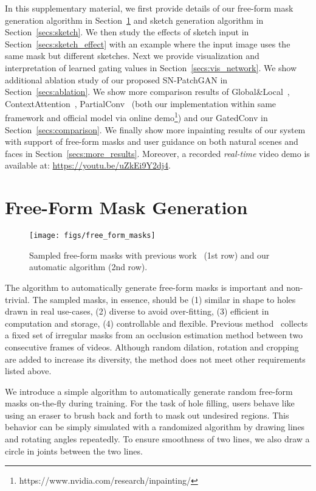 \documentclass[10pt,twocolumn,letterpaper]{article}
\begin{document}
{\small


}

\newpage
\appendix


In this supplementary material, we first provide details of our free-form mask generation algorithm in Section~\ref{secs:mask} and sketch generation algorithm in Section~\ref{secs:sketch}.
We then study the effects of sketch input in Section~\ref{secs:sketch_effect} with an example where the input image uses the same mask but different sketches.
Next we provide visualization and interpretation of learned gating values in Section~\ref{secs:vis_network}.
We show additional ablation study of our proposed SN-PatchGAN in Section~\ref{secs:ablation}.
We show more comparison results of Global\&Local~\cite{iizuka2017globally}, ContextAttention~\cite{yu2018generative}, PartialConv~\cite{liu2018image} (both our implementation within same framework and official model via online demo\footnote{https://www.nvidia.com/research/inpainting/}) and our GatedConv in Section~\ref{secs:comparison}. We finally show more inpainting results of our system with support of free-form masks and user guidance on both natural scenes and faces in Section~\ref{secs:more_results}. Moreover, a recorded \textit{real-time} video demo is available at: \url{https://youtu.be/uZkEi9Y2dj4}.

\section{Free-Form Mask Generation} \label{secs:mask}
\begin{figure}[h]
  \centering
  \texttt{[image: figs/free\_form\_masks]}
  \caption{Sampled free-form masks with previous work~\cite{liu2018image} (1st row) and our automatic algorithm (2nd row). }
  \label{figs:masks}
\end{figure}

The algorithm to automatically generate free-form masks is important and non-trivial. The sampled masks, in essence, should be (1) similar in shape to holes drawn in real use-cases, (2) diverse to avoid over-fitting, (3) efficient in computation and storage, (4) controllable and flexible. Previous method~\cite{liu2018image} collects a fixed set of irregular masks from an occlusion estimation method between two consecutive frames of videos. Although random dilation, rotation and cropping are added to increase its diversity, the method does not meet other requirements listed above. 

We introduce a simple algorithm to automatically generate random free-form masks on-the-fly during training. For the task of hole filling, users behave like using an eraser to brush back and forth to mask out undesired regions. This behavior can be simply simulated with a randomized algorithm by drawing lines and rotating angles repeatedly. To ensure smoothness of two lines, we also draw a circle in joints between the two lines.
\end{document}
